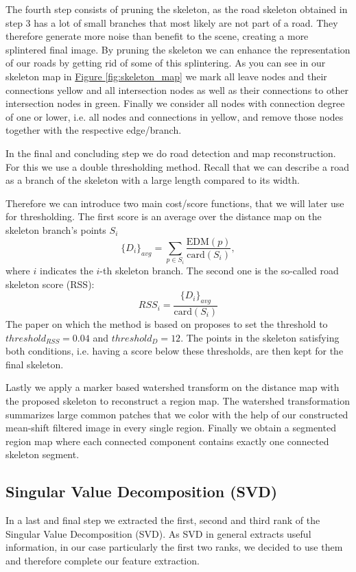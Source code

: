 \documentclass[10pt,conference,compsocconf]{IEEEtran}
\newcommand{\figref}[1]{\hyperref[#1]{Figure \ref*{#1}}}
\begin{document}
The fourth step consists of pruning the skeleton, as the road skeleton obtained in step 3 has a lot of small branches that most likely are not part of a road. They therefore generate more noise than benefit to the scene, creating a more splintered final image. By pruning the skeleton we can enhance the representation of our roads by getting rid of some of this splintering. As you can see in our skeleton map in \figref{fig:skeleton_map} we mark all leave nodes and their connections yellow and all intersection nodes as well as their connections to other intersection nodes in green. Finally we consider all nodes with connection degree of one or lower, i.e. all nodes and connections in yellow, and remove those nodes together with the respective edge/branch.

In the final and concluding step we do road detection and map reconstruction. For this we use a double thresholding method. Recall that we can describe a road as a branch of the skeleton with a large length compared to its width. 

Therefore we can introduce two main cost/score functions, that we will later use for thresholding. The first score is an average over the distance map on the skeleton branch's points $S_{i}$
$$
\{D_i\}_{avg} = \sum_{p \in S_{i}}{\frac{\textrm{EDM}(p)}{\textrm{card}(S_{i})}},
$$
where $i$ indicates the $i$-th skeleton branch. The second one is the so-called road skeleton score (RSS):
$$
RSS_{i} = \frac{{\{D_i\}}_{avg}}{\textrm{card}(S_{i})}
$$
The paper on which the method is based on \cite{GaZeScPo11} proposes to set the threshold to $threshold_{RSS} = 0.04$ and $threshold_{D} = 12$. The points in the skeleton satisfying both conditions, i.e. having a score below these thresholds, are then kept for the final skeleton.

Lastly we apply a marker based watershed transform on the distance map with the proposed skeleton to reconstruct a region map. The watershed transformation summarizes large common patches that we color with the help of our constructed mean-shift filtered image in every single region. Finally we obtain a segmented region map where each connected component contains exactly one connected skeleton segment. 

\subsection{Singular Value Decomposition (SVD)}

In a last and final step we extracted the first, second and third rank of the Singular Value Decomposition (SVD). As SVD in general extracts useful information, in our case particularly the first two ranks, we decided to use them and therefore complete our feature extraction.
\end{document}
